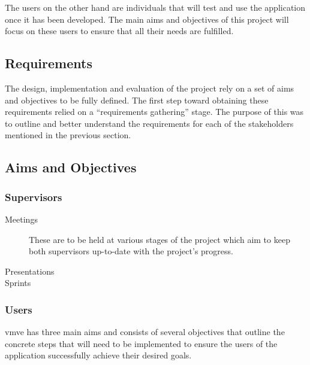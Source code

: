 \documentclass[11pt]{article}
\begin{document}
The users on the other hand are individuals that will test and use the
application once it has been developed. The main aims and objectives of this
project will focus on these users to ensure that all their needs are fulfilled.

\subsection{Requirements}
The design, implementation and evaluation of the project rely on a set of aims
and objectives to be fully defined. The first step toward obtaining these
requirements relied on a ``requirements gathering'' stage. The purpose of this
was to outline and better understand the requirements for each of the
stakeholders mentioned in the previous section.

\subsection{Aims and Objectives}
\subsubsection{Supervisors}

\begin{description}
  \item[Meetings] These are to be held at various stages of the project which
  aim to keep both supervisors up-to-date with the project's progress.
  \item[Presentations] 
  \item[Sprints] 
\end{description}

\subsubsection{Users}
\gls*{vmve} has three main aims and consists of several objectives that outline
the concrete steps that will need to be implemented to ensure the users of the
application successfully achieve their desired goals.
\end{document}
